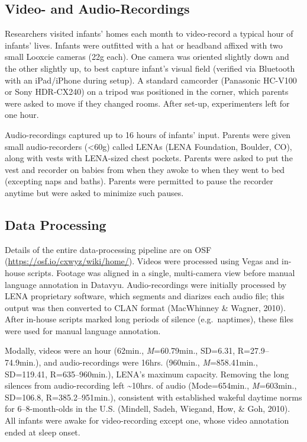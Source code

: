 \documentclass[man]{apa6}
\theoremstyle{definition}
\theoremstyle{definition}
\theoremstyle{definition}
\theoremstyle{remark}
\begin{document}
\subsection{Video- and
Audio-Recordings}\label{video--and-audio-recordings}

Researchers visited infants' homes each month to video-record a typical
hour of infants' lives. Infants were outfitted with a hat or headband
affixed with two small Looxcie cameras (22g each). One camera was
oriented slightly down and the other slightly up, to best capture
infant's visual field (verified via Bluetooth with an iPad/iPhone during
setup). A standard camcorder (Panasonic HC-V100 or Sony HDR-CX240) on a
tripod was positioned in the corner, which parents were asked to move if
they changed rooms. After set-up, experimenters left for one hour.

Audio-recordings captured up to 16 hours of infants' input. Parents were
given small audio-recorders (\textless{}60g) called LENAs (LENA
Foundation, Boulder, CO), along with vests with LENA-sized chest
pockets. Parents were asked to put the vest and recorder on babies from
when they awoke to when they went to bed (excepting naps and baths).
Parents were permitted to pause the recorder anytime but were asked to
minimize such pauses.

\subsection{Data Processing}\label{data-processing}

Details of the entire data-processing pipeline are on OSF
(\url{https://osf.io/cxwyz/wiki/home/}). Videos were processed using
Vegas and in-house scripts. Footage was aligned in a single,
multi-camera view before manual language annotation in Datavyu.
Audio-recordings were initially processed by LENA proprietary software,
which segments and diarizes each audio file; this output was then
converted to CLAN format (MacWhinney \& Wagner, 2010). After in-house
scripts marked long periods of silence (e.g.~naptimes), these files were
used for manual language annotation.

Modally, videos were an hour (62min., \emph{M}=60.79min., SD=6.31,
R=27.9--74.9min.), and audio-recordings were 16hrs. (960min.,
\emph{M}=858.41min., SD=119.41, R=635--960min.), LENA's maximum
capacity. Removing the long silences from audio-recording left
\textasciitilde{}10hrs. of audio (Mode=654min., \emph{M}=603min.,
SD=106.8, R=385.2--951min.), consistent with established wakeful daytime
norms for 6--8-month-olds in the U.S. (Mindell, Sadeh, Wiegand, How, \&
Goh, 2010). All infants were awake for video-recording except one, whose
video annotation ended at sleep onset.
\end{document}
